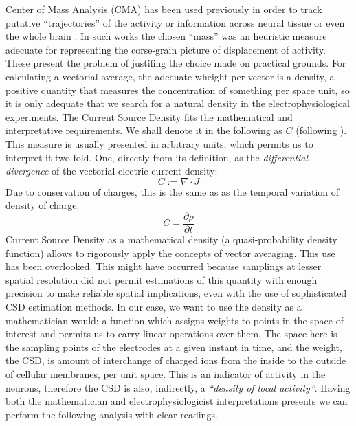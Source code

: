 \documentclass[12pt]{article}
\begin{document}
Center of Mass Analysis (CMA) has been used previously in order to track putative  ``trajectories'' of the activity or information across neural tissue or even the whole brain \cite{Chao05, Chao07, Manjarrez07, Manjarrez09}. In such works the chosen ``mass'' was an heuristic measure adecuate for representing the corse-grain picture of displacement of activity. These present the problem of justifing the choice made on practical grounds. For calculating a vectorial average, the adecuate wheight per vector is a density, a positive quantity that measures the concentration of something per space unit, so it is only adequate that we search for a natural density in the electrophysiological experiments. The Current Source Density fits the mathematical and interpretative requirements. We shall denote it in the following as $C$ (following \cite{Potworowski2011}).  This measure is usually presented in arbitrary units, which permits us to interpret it two-fold. One, directly from its definition, as the \emph{differential divergence} of the vectorial electric current density:
\begin{equation}
  C:=\nabla \cdot J
\end{equation}
Due to conservation of charges, this is the same as as the temporal variation of density of charge:
\begin{equation}
  C=\frac{\partial \rho}{\partial t}
\end{equation}
Current Source Density as a mathematical density (a quasi-probability density function)  allows  to rigorously apply the concepts of vector averaging. This use has been overlooked. This might have occurred because  samplings at lesser spatial resolution did not permit estimations of this quantity with enough precision to make reliable spatial implications, even with the use of sophisticated CSD estimation methods. In our case, we want to use the density as a mathematician would: a function which assigns weights to points in the space of interest and permits us to carry linear operations over them.  The space here is the sampling points of the electrodes at a given instant in time, and the weight, the CSD, is amount of interchange of charged ions from the inside to the outside of cellular membranes, per unit space.  This is an indicator of activity in the neurons, therefore the CSD is also, indirectly, a \emph{``density of local activity''}. Having both
the mathematician and electrophysiologicist interpretations presents we can
perform the following analysis with clear readings. 
\end{document}
